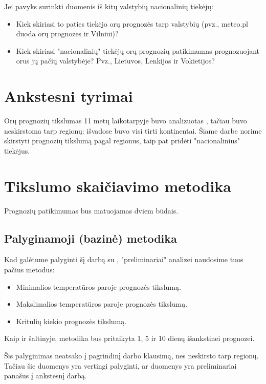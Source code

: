 \documentclass{article}
\begin{document}
Jei pavyks surinkti duomenis iš kitų valstybių nacionalinių tiekėjų:
\begin{itemize}
    \item Kiek skiriasi to paties tiekėjo orų prognozės tarp valstybių (pvz.,
        meteo.pl duoda orų prognozes ir Vilniui)?
    \item Kiek skiriasi "nacionalinių" tiekėjų orų prognozių patikimumas
        prognozuojant orus jų pačių valstybėje? Pvz., Lietuvos, Lenkijos ir
        Vokietijos?
\end{itemize}

\section{Ankstesni tyrimai}

Orų prognozių tikslumas 11 metų laikotarpyje buvo analizuotas
\cite{rose2017analysis}, tačiau buvo neskirstoma tarp regionų: išvadose buvo
visi tirti kontinentai. Šiame darbe norime skirstyti prognozių tikslumą pagal
regionus, taip pat pridėti "nacionalinius" tiekėjus.

\section{Tikslumo skaičiavimo metodika}

Prognozių patikimumas bus matuojamas dviem būdais.

\subsection{Palyginamoji (bazinė) metodika}

Kad galėtume palyginti šį darbą su \cite{rose2017analysis}, "preliminariai"
analizei naudosime tuos pačius metodus:

\begin{itemize}
    \item Minimalios temperatūros paroje prognozės tikslumą.
    \item Makslimalios temperatūros paroje prognozės tikslumą.
    \item Kritulių kiekio prognozės tikslumą.
\end{itemize}

Kaip ir šaltinyje, metodika bus pritaikyta 1, 5 ir 10 dienų išankstinei
prognozei.

Šis palyginimas neatsako į pagrindinį darbo klausimą, nes neskirsto tarp
regionų. Tačiau šie duomenys yra vertingi palyginti, ar duomenys yra preliminariai
panašūs į ankstesnį darbą.
\end{document}
